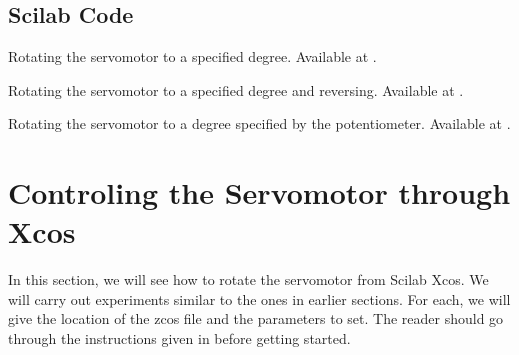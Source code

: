 \subsection{Scilab Code}
\lstset{style=mystyle}
\label{sec:servo-scilab-code}

\begin{scicode}
   {Rotating
    the servomotor to a specified degree.  Available at
    .}
  \label{sci:servo-init}
  
\end{scicode}

\begin{scicode}
   {Rotating 
    the servomotor to a specified degree and reversing.  Available at
    .}
  \label{sci:servo-reverse}
  
\end{scicode}

\begin{scicode}
  \label{sci:servo-loop}
  
\end{scicode}

\begin{scicode}
   {Rotating the servomotor to a degree specified by
    the potentiometer.  Available at .}
  \label{sci:servo-pot}
  
\end{scicode}


\section{Controling the Servomotor through Xcos}
\label{sec:servo-xcos}
In this section, we will see how to rotate the servomotor from Scilab
Xcos.  We will carry out experiments similar to the ones in earlier
sections.  For each, we will give the location of the zcos file and
the parameters to set.  The reader should go through the instructions
given in  before getting started.

